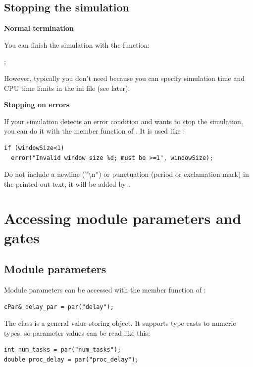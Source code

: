 \subsection{Stopping the simulation}

\textbf{Normal termination}


You can finish the simulation with the  function:


;


However, typically you don't need  because you
can specify simulation time and CPU time limits in the ini file (see later).


\textbf{Stopping on errors}


If your simulation detects an error condition and wants to stop
the simulation, you can do it with the  member function
of . It is used like :

\begin{verbatim}
if (windowSize<1)
  error("Invalid window size %d; must be >=1", windowSize);
\end{verbatim}


Do not include a newline (''{\textbackslash}n'') or punctuation (period
or exclamation mark) in the printed-out text, it will be added
by {\opp}.





\section{Accessing module parameters and gates}

\subsection{Module parameters}

Module parameters can be accessed
with the  member function of :

\begin{verbatim}
cPar& delay_par = par("delay");
\end{verbatim}

The  class is a general value-storing object. It supports
type casts to numeric types, so parameter values can be read
like this:

\begin{verbatim}
int num_tasks = par("num_tasks");
double proc_delay = par("proc_delay");
\end{verbatim}

